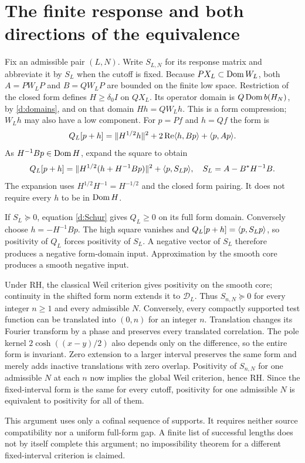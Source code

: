 \section{The finite response and both directions of the equivalence}
Fix an admissible pair $(L,N)$. Write $S_{L,N}$ for its response matrix
and abbreviate it by $S_L$ when the cutoff is fixed.
Because $PX_L\subset\operatorname{Dom} W_L$, both $A=PW_LP$ and $B=QW_LP$ are bounded
on the finite low space. Restriction of the closed form defines
$H\ge\delta_0I$ on $QX_L$. Its operator domain is
$Q\operatorname{Dom} b(H_N)$, by \eqref{d:domains}, and on that domain $Hh=QW_Lh$.
This is a form compression; $W_Lh$ may also have a low component.
For $p=Pf$ and $h=Qf$ the form is
\[
Q_L[p+h]=\lVert H^{1/2}h\rVert^2+2\operatorname{Re}\langle h,Bp\rangle+\langle p,Ap\rangle.
\]
As $H^{-1}Bp\in\operatorname{Dom} H$, expand the square to obtain
\begin{equation}\label{d:Schur}
Q_L[p+h]=\lVert H^{1/2}(h+H^{-1}Bp)\rVert^2+\langle p,S_Lp\rangle,
\quad S_L=A-B^*H^{-1}B.
\end{equation}
The expansion uses $H^{1/2}H^{-1}=H^{-1/2}$ and the closed form pairing.
It does not require every $h$ to be in $\operatorname{Dom} H$.

If $S_L\succeq0$, equation \eqref{d:Schur} gives $Q_L\ge0$ on its full
form domain. Conversely choose $h=-H^{-1}Bp$. The high square vanishes
and $Q_L[p+h]=\langle p,S_Lp\rangle$, so positivity of $Q_L$ forces positivity of
$S_L$. A negative vector of $S_L$ therefore produces a negative form-domain
input. Approximation by the smooth core produces a smooth negative input.

Under RH, the classical Weil criterion gives positivity on the smooth
core; continuity in the shifted form norm extends it to $\mathcal D_L$.
Thus $S_{n,N}\succeq0$ for every integer $n\ge1$ and every admissible $N$.
Conversely, every compactly supported test function can be translated into
$(0,n)$ for an integer $n$. Translation changes its Fourier transform by
a phase and preserves every translated correlation. The pole kernel
$2\cosh((x-y)/2)$ also depends only on the difference, so the entire form
is invariant. Zero extension to a larger interval preserves the same
form and merely adds inactive translations with zero overlap. Positivity
of $S_{n,N}$ for one admissible $N$ at each $n$ now implies the global
Weil criterion, hence RH. Since the fixed-interval form is the same for
every cutoff, positivity for one admissible $N$ is equivalent to positivity
for all of them.

This argument uses only a cofinal sequence of supports. It requires
neither source compatibility nor a uniform full-form gap. A finite list
of successful lengths does not by itself complete this argument; no
impossibility theorem for a different fixed-interval criterion is claimed.

